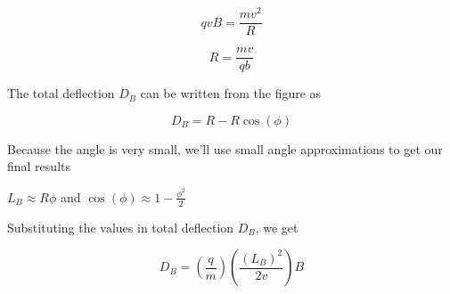 \documentclass{article}
\begin{document}
$$qvB=\frac{{mv^2}}{{R}}$$

 $$R = \frac{{mv}}{{qb}}$$

 The total deflection $D_B$ can be written from the figure as

 $$ D_B= R - R \cos(\phi)$$

 Because the angle is very small, we'll use small angle approximations to get our final results

 $L_B\approx R\phi$ and $\cos(\phi)\approx 1-\frac{{\phi^2}}{{2}}
$

Substituting the values in total deflection $D_B$, we get 

$$D_B=\left(\frac{{q}}{{m}}\right) \left(\frac{{(L_B)^2}}{{2v}}\right) B
$$
\end{document}
